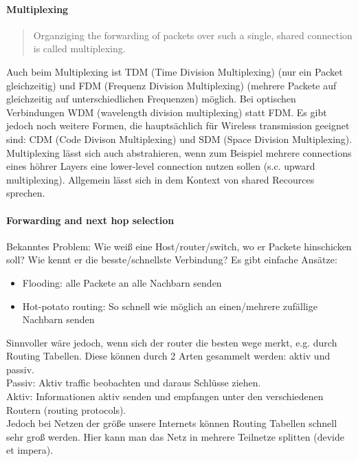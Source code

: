     \paragraph{Multiplexing}
        \begin{quote}
            \frQuo Organziging the forwarding of packets over such a single, shared connection is called multiplexing.\frQuc
        \end{quote}
        Auch beim Multiplexing ist TDM (Time Division Multiplexing) (nur ein Packet gleichzeitig) und FDM (Frequenz Division Multiplexing) (mehrere Packete auf gleichzeitig auf unterschiedlichen Frequenzen) möglich. Bei optischen Verbindungen WDM (wavelength division multiplexing) statt FDM. 
        Es gibt jedoch noch weitere Formen, die hauptsächlich für Wireless transmission geeignet sind: CDM (Code Divison Multiplexing) und SDM (Space Division Multiplexing). \\
        Multiplexing lässt sich auch abstrahieren, wenn zum Beispiel mehrere connections eines höhrer Layers eine lower-level connection nutzen sollen (s.c. upward multiplexing). Allgemein lässt sich in dem Kontext von shared Recources sprechen.

    \paragraph{Forwarding and next hop selection}
        Bekanntes Problem: Wie weiß eine Host/router/switch, wo er Packete hinschicken soll? Wie kennt er die besste/schnellste Verbindung? Es gibt einfache Ansätze:
        \begin{itemize}
            \item Flooding: alle Packete an alle Nachbarn senden
            \item Hot-potato routing: So schnell wie möglich an einen/mehrere zufällige Nachbarn senden
        \end{itemize}
        Sinnvoller wäre jedoch, wenn sich der router die besten wege merkt, e.g. durch Routing Tabellen. Diese können durch 2 Arten gesammelt werden: aktiv und passiv. \\
        Passiv: Aktiv traffic beobachten und daraus Schlüsse ziehen. \\
        Aktiv: Informationen aktiv senden und empfangen unter den verschiedenen Routern (routing protocols). \\
        Jedoch bei Netzen der größe unsere Internets können Routing Tabellen schnell sehr groß werden. Hier kann man das Netz in mehrere Teilnetze splitten (devide et impera). 
        
